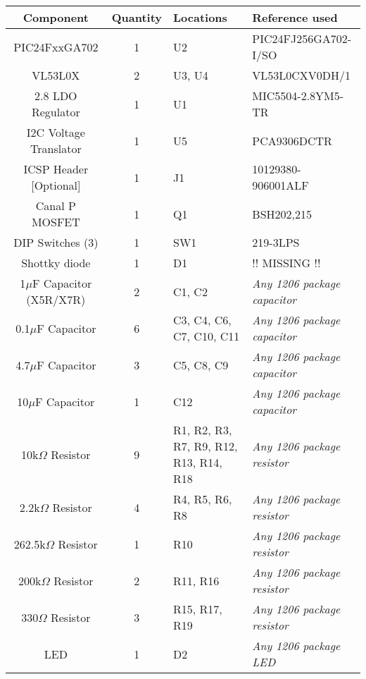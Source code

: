 \begin{tabularx}{\textwidth}{|c|c|X|X|}
\hline 
Component & Quantity & Locations & Reference used \\ 
\hline 
PIC24FxxGA702 & 1 & U2 & PIC24FJ256GA702-I/SO \\ 
\hline 
VL53L0X & 2 & U3, U4 & VL53L0CXV0DH/1 \\ 
\hline 
2.8 LDO Regulator & 1 & U1 & MIC5504-2.8YM5-TR \\ 
\hline 
I2C Voltage Translator & 1 & U5 & PCA9306DCTR \\ 
\hline 
ICSP Header [Optional] & 1 & J1 & 10129380-906001ALF \\ 
\hline 
Canal P MOSFET & 1 & Q1 & BSH202,215 \\ 
\hline 
DIP Switches (3) & 1 & SW1 & 219-3LPS \\ 
\hline 
Shottky diode & 1 & D1 & \color{red}!! MISSING !!\\ 
\hline 
1$\mu$F Capacitor (X5R/X7R) & 2 & C1, C2 & \textit{Any 1206 package capacitor}\\ 
\hline 
0.1$\mu$F Capacitor & 6 & C3, C4, C6, C7, C10, C11 & \textit{Any 1206 package capacitor}\\ 
\hline 
4.7$\mu$F Capacitor & 3 & C5, C8, C9 & \textit{Any 1206 package capacitor}\\ 
\hline 
10$\mu$F Capacitor & 1 & C12 & \textit{Any 1206 package capacitor}\\ 
\hline 
10k$\Omega$ Resistor & 9 & R1, R2, R3, R7, R9, R12, R13, R14, R18 & \textit{Any 1206 package resistor}\\ 
\hline 
2.2k$\Omega$ Resistor & 4 & R4, R5, R6, R8 & \textit{Any 1206 package resistor}\\ 
\hline 
262.5k$\Omega$ Resistor & 1 & R10 & \textit{Any 1206 package resistor}\\ 
\hline 
200k$\Omega$ Resistor & 2 & R11, R16 & \textit{Any 1206 package resistor}\\ 
\hline 
330$\Omega$ Resistor & 3 & R15, R17, R19 & \textit{Any 1206 package resistor}\\ 
\hline 
LED & 1 & D2 & \textit{Any 1206 package LED}\\ 
\hline 
\end{tabularx} 